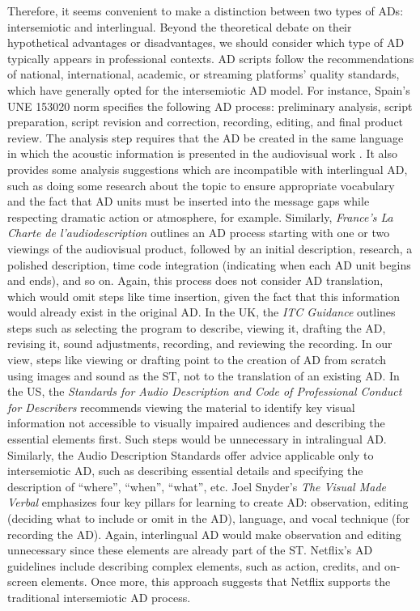 \documentclass[english]{textolivre}
\begin{document}
Therefore, it seems convenient to make a distinction between two types of ADs: intersemiotic and interlingual. Beyond the theoretical debate on their hypothetical advantages or disadvantages, we should consider which type of AD typically appears in professional contexts. AD scripts follow the recommendations of national, international, academic, or streaming platforms’ quality standards, which have generally opted for the intersemiotic AD model. For instance, Spain’s UNE 153020 norm \cite{aenor2005} specifies the following AD process: preliminary analysis, script preparation, script revision and correction, recording, editing, and final product review. The analysis step requires that the AD be created in the same language in which the acoustic information is presented in the audiovisual work \cite{aenor2005}. It also provides some analysis suggestions which are incompatible with interlingual AD, such as doing some research about the topic to ensure appropriate vocabulary and the fact that AD units must be inserted into the message gaps while respecting dramatic action or atmosphere, for example. Similarly, \textit{France’s La Charte de l'audiodescription} \cite{morisset2008} outlines an AD process starting with one or two viewings of the audiovisual product, followed by an initial description, research, a polished description, time code integration (indicating when each AD unit begins and ends), and so on. Again, this process does not consider AD translation, which would omit steps like time insertion, given the fact that this information would already exist in the original AD. In the UK, the \textit{ITC Guidance} \citeyear{itc2000} outlines steps such as selecting the program to describe, viewing it, drafting the AD, revising it, sound adjustments, recording, and reviewing the recording. In our view, steps like viewing or drafting point to the creation of AD from scratch using images and sound as the ST, not to the translation of an existing AD. In the US, the \textit{Standards for Audio Description and Code of Professional Conduct for Describers} \cite{audio_description_coalition2009} recommends viewing the material to identify key visual information not accessible to visually impaired audiences and describing the essential elements first. Such steps would be unnecessary in intralingual AD. Similarly, the Audio Description Standards \cite{california_audio_describers_alliance2009} offer advice applicable only to intersemiotic AD, such as describing essential details and specifying the description of “where”, “when”, “what”, etc. Joel Snyder’s \textit{The Visual Made Verbal} \citeyear{snyder2014} emphasizes four key pillars for learning to create AD: observation, editing (deciding what to include or omit in the AD), language, and vocal technique (for recording the AD). Again, interlingual AD would make observation and editing unnecessary since these elements are already part of the ST. Netflix’s AD guidelines \citeyear{netflix2024} include describing complex elements, such as action, credits, and on-screen elements. Once more, this approach suggests that Netflix supports the traditional intersemiotic AD process. 
\end{document}
